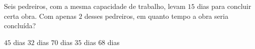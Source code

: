 Seis pedreiros, com a mesma capacidade de trabalho, levam $15$ dias para concluir certa obra. Com apenas $2$ desses pedreiros, em quanto tempo a obra seria concluída?

$45$ dias
$32$ dias
$70$ dias
$35$ dias
$68$ dias



